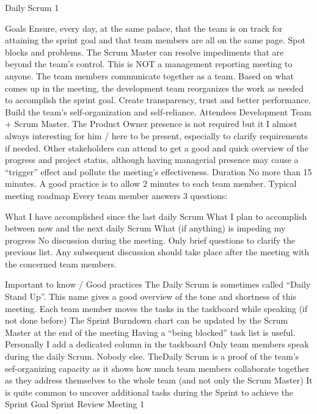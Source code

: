 Daily Scrum 1


Goals
Ensure, every day, at the same palace, that the team is on track for attaining the sprint goal and that team members are all on the same page.
Spot blocks and problems. The Scrum Master can resolve impediments that are beyond the team’s control.
This is NOT a management reporting meeting to anyone. The team members communicate together as a team.
Based on what comes up in the meeting, the development team reorganizes the work as needed to accomplish the sprint goal.
Create transparency, trust and better performance. Build the team’s self-organization and self-reliance.
Attendees
Development Team + Scrum Master.
The Product Owner presence is not required but it I almost always interesting for him / here to be present, especially to clarify requirements if needed.
Other stakeholders can attend to get a good and quick overview of the progress and project status, although having managerial presence may cause a “trigger” effect and pollute the meeting’s effectiveness.
Duration
No more than 15 minutes.
A good practice is to allow 2 minutes to each team member.
Typical meeting roadmap
Every team member answers 3 questions:



What I have accomplished since the last daily Scrum
What I plan to accomplish between now and the next daily Scrum
What (if anything) is impeding my progress
No discussion during the meeting. Only brief questions to clarify the previous list. Any subsequent discussion should take place after the meeting with the concerned team members.

Important to know / Good practices
The Daily Scrum is sometimes called “Daily Stand Up”. This name gives a good overview of the tone and shortness of this meeting.
Each team member moves the tasks in the taskboard while speaking (if not done before)
The Sprint Burndown chart can be updated by the Scrum Master at the end of the meeting
Having a “being blocked” task list is useful. Personally I add a dedicated column in the taskboard
Only team members speak during the daily Scrum. Nobody else.
TheDaily Scrum is a proof of the team’s sef-organizing capacity as it shows how much team members collaborate together as they address themselves to the whole team (and not only the Scrum Master)
It is quite common to uncover additional tasks during the Sprint to achieve the Sprint Goal
Sprint Review Meeting 1


